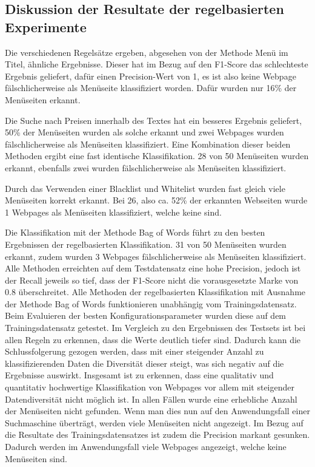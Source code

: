 \subsection{Diskussion der Resultate der regelbasierten Experimente}
Die verschiedenen Regelsätze ergeben, abgesehen von der Methode \glqq Menü im Titel\grqq{}, ähnliche Ergebnisse.
Dieser hat im Bezug auf den F1-Score das schlechteste Ergebnis geliefert, dafür einen Precision-Wert von 1, es ist also keine Webpage fälschlicherweise als Menüseite klassifiziert worden.
Dafür wurden nur 16\% der Menüseiten erkannt.

Die Suche nach Preisen innerhalb des Textes hat ein besseres Ergebnis geliefert, 50\% der Menüseiten wurden als solche erkannt und zwei Webpages wurden fälschlicherweise als Menüseiten klassifiziert. 
Eine Kombination dieser beiden Methoden ergibt eine fast identische Klassifikation.
28 von 50 Menüseiten wurden erkannt, ebenfalls zwei wurden fälschlicherweise als Menüseiten klassifiziert.

Durch das Verwenden einer Blacklist und Whitelist wurden fast gleich viele Menüseiten korrekt erkannt. Bei 26, also ca. 52\% der erkannten Webseiten wurde 1 Webpages als Menüseiten klassifiziert, welche keine sind.

Die Klassifikation mit der Methode \glqq Bag of Words\grqq{} führt zu den besten Ergebnissen der regelbasierten Klassifikation.
31 von 50 Menüseiten wurden erkannt, zudem wurden 3 Webpages fälschlicherweise als Menüseiten klassifiziert.\\

Alle Methoden erreichten auf dem Testdatensatz eine hohe Precision, jedoch ist der Recall jeweils so tief, dass der F1-Score nicht die vorausgesetzte Marke von 0.8 überschreitet.
Alle Methoden der regelbasierten Klassifikation mit Ausnahme der Methode \glqq Bag of Words\grqq{} funktionieren unabhängig vom Trainingsdatensatz.
Beim Evaluieren der besten Konfigurationsparameter wurden diese auf dem Trainingsdatensatz getestet.
Im Vergleich zu den Ergebnissen des Testsets ist bei allen Regeln zu erkennen, dass die Werte deutlich tiefer sind.
Dadurch kann die Schlussfolgerung gezogen werden, dass mit einer steigender Anzahl zu klassifizierenden Daten die Diversität dieser steigt, was sich negativ auf die Ergebnisse auswirkt.
Insgesamt ist zu erkennen, dass eine qualitativ und quantitativ hochwertige Klassifikation von Webpages vor allem mit steigender Datendiversität nicht möglich ist.
In allen Fällen wurde eine erhebliche Anzahl der Menüseiten nicht gefunden.
Wenn man dies nun auf den Anwendungsfall einer Suchmaschine überträgt, werden viele Menüseiten nicht angezeigt.
Im Bezug auf die Resultate des Trainingsdatensatzes ist zudem die Precision markant gesunken.
Dadurch werden im Anwendungsfall viele Webpages angezeigt, welche keine Menüseiten sind.
